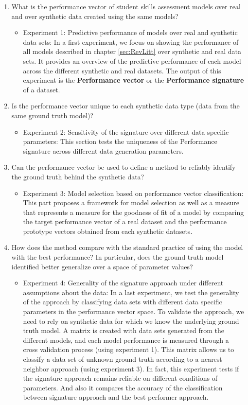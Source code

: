 \begin{enumerate}
\item What is the performance vector of student skills assessment models over real and over synthetic data created using the same models?
\begin{itemize}
\item Experiment 1: Predictive performance of models over real and synthetic data sets: In a first experiment, we focus on showing the performance of all models described in chapter \ref{sec:RevLitt} over synthetic and real data sets.  It provides an overview of the predictive performance of each model across the different synthetic and real datasets. The output of this experiment is the \textbf{Performance vector} or the \textbf{Performance signature} of a dataset.
\end{itemize}
\item Is the performance vector unique to each synthetic data type (data from the same ground truth model)?
\begin{itemize}
\item Experiment 2: Sensitivity of the signature over different data specific parameters: This section tests the uniqueness of the Performance signature across different data generation parameters.
\end{itemize}
\item Can the performance vector be used to define a method to reliably identify the ground truth behind the synthetic data?
\begin{itemize}
\item Experiment 3: Model selection based on performance vector classification: This part proposes a framework for model selection as well as a measure that represents a measure for the goodness of fit of a model by comparing the target performance vector of a real dataset and the performance prototype vectors obtained from each synthetic datasets.
\end{itemize}
\item How does the method compare with the standard practice of using the model with the best performance?  In particular, does the ground truth model identified better generalize over a space of parameter values?
\begin{itemize}
\item Experiment 4: Generality of the signature approach under different assumptions about the data: In a last experiment, we test the generality of the approach by classifying data sets with different data specific parameters in the performance vector space. To validate the approach, we need to rely on synthetic data for which we know the underlying ground truth model.  A matrix is created with data sets generated from the different models, and each model performance is measured through a cross validation process (using experiment 1). This matrix allows us to classify a data set of unknown ground truth according to a nearest neighbor approach (using experiment 3). In fact, this experiment tests if the signature approach remains reliable on different conditions of parameters. And also it compares the accuracy of the classification between signature approach and the best performer approach. 

\end{itemize}
\end{enumerate}
